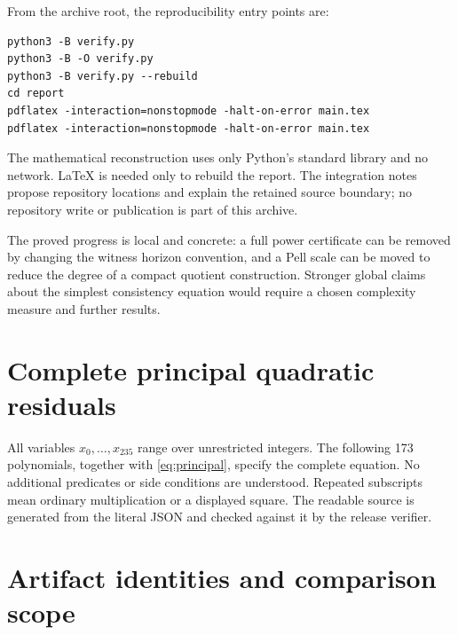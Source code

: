\documentclass[11pt]{article}
\theoremstyle{definition}
\begin{document}
From the archive root, the reproducibility entry points are:
\begin{lstlisting}
python3 -B verify.py
python3 -B -O verify.py
python3 -B verify.py --rebuild
cd report
pdflatex -interaction=nonstopmode -halt-on-error main.tex
pdflatex -interaction=nonstopmode -halt-on-error main.tex
\end{lstlisting}
The mathematical reconstruction uses only Python's standard library
and no network. LaTeX is needed only to rebuild the report. The
integration notes propose repository locations and explain the
retained source boundary; no repository write or publication is
part of this archive.

The proved progress is local and concrete: a full power certificate
can be removed by changing the witness horizon convention, and a
Pell scale can be moved to reduce the degree of a compact quotient
construction. Stronger global claims about the simplest consistency
equation would require a chosen complexity measure and further results.

\appendix
\section{Complete principal quadratic residuals}
\label{sec:residuals}

All variables $x_0,\ldots,x_{235}$ range over unrestricted integers.
The following 173 polynomials, together with \eqref{eq:principal},
specify the complete equation. No additional predicates or side
conditions are understood. Repeated subscripts mean ordinary
multiplication or a displayed square. The readable source is generated
from the literal JSON and checked against it by the release verifier.



\section{Artifact identities and comparison scope}
\end{document}
